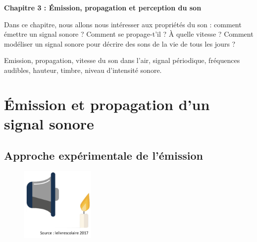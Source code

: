 \renewcommand{\thesubsection}{\textcolor{red}{\Roman{section}.\arabic{subsection}}}
\renewcommand{\thesubsubsection}{\textcolor{red}{\Roman{section}.\arabic{subsection}.\alph{subsubsection}}}

\setcounter{section}{0}
\sndEnTeteCoursTrois

\begin{mdframed}[style=titr, leftmargin=60pt, rightmargin=60pt, innertopmargin=7pt, innerbottommargin=7pt, innerrightmargin=8pt, innerleftmargin=8pt]

\begin{center}
\large{\textbf{Chapitre 3 : \'{E}mission, propagation et perception du son}}
\end{center}
\end{mdframed}
Dans ce chapitre, nous allons nous intéresser aux propriétés du son : comment émettre un signal sonore ? Comment se propage-t'il ? \`{A} quelle vitesse ? Comment modéliser un signal sonore pour décrire des sons de la vie de tous les jours ?

\begin{tcolorbox}[colback=blue!5!white,colframe=blue!75!black,title=Mots clés du chapitre :]
Emission, propagation, vitesse du son dans l'air, signal périodique, fréquences audibles, hauteur, timbre, niveau d'intensité sonore.
\end{tcolorbox}


\section{\'{E}mission et propagation d'un signal sonore}
\subsection{Approche expérimentale de l'émission}
\begin{figure}
\vspace{-1.5cm}
    \centering
     \includegraphics[width=0.32\textwidth]{Images/Chapitre_3/Haut_parleur_bougie.PNG}
   \end{figure}


